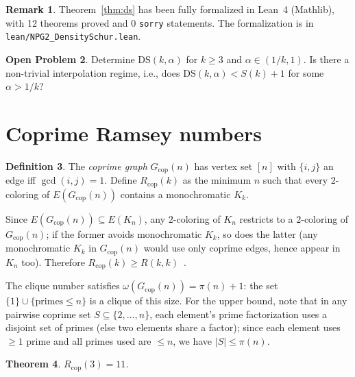 \documentclass[11pt]{article}
\theoremstyle{plain}
\newtheorem{theorem}{Theorem}[section]
\theoremstyle{definition}
\newtheorem{definition}[theorem]{Definition}
\newtheorem{problem}[theorem]{Open Problem}
\newtheorem{remark}[theorem]{Remark}
\newcommand{\DS}{\mathrm{DS}}
\newcommand{\Rcop}{R_{\mathrm{cop}}}
\newcommand{\Gcop}{G_{\mathrm{cop}}}
\begin{document}
\begin{remark}\label{rem:lean}
Theorem~\ref{thm:ds} has been fully formalized in Lean~4 (Mathlib),
with 12 theorems proved and 0 \texttt{sorry} statements. The
formalization is in \texttt{lean/NPG2\_DensitySchur.lean}.
\end{remark}

\begin{problem}\label{prob:ds}
Determine $\DS(k,\alpha)$ for $k\ge 3$ and $\alpha\in(1/k,1)$.
Is there a non-trivial interpolation regime, i.e., does
$\DS(k,\alpha)<S(k)+1$ for some $\alpha>1/k$?
\end{problem}

\section{Coprime Ramsey numbers}\label{sec:rcop}

\begin{definition}\label{def:rcop}
The \emph{coprime graph} $\Gcop(n)$ has vertex set $[n]$ with
$\{i,j\}$ an edge iff $\gcd(i,j)=1$. Define $\Rcop(k)$ as the
minimum $n$ such that every $2$-coloring of $E(\Gcop(n))$ contains a
monochromatic $K_k$.
\end{definition}

Since $E(\Gcop(n))\subseteq E(K_n)$, any $2$-coloring of $K_n$
restricts to a $2$-coloring of $\Gcop(n)$; if the former avoids
monochromatic $K_k$, so does the latter (any monochromatic $K_k$ in
$\Gcop(n)$ would use only coprime edges, hence appear in $K_n$ too).
Therefore $\Rcop(k)\ge R(k,k)$~\cite{ramsey1930}.

The clique number satisfies $\omega(\Gcop(n))=\pi(n)+1$: the set
$\{1\}\cup\{\text{primes}\le n\}$ is a clique of this size. For the
upper bound, note that in any pairwise coprime set $S\subseteq\{2,
\ldots,n\}$, each element's prime factorization uses a disjoint set
of primes (else two elements share a factor); since each element
uses $\ge 1$ prime and all primes used are $\le n$, we have
$|S|\le\pi(n)$.

\begin{theorem}\label{thm:rcop3}
$\Rcop(3)=11$.
\end{theorem}
\end{document}
